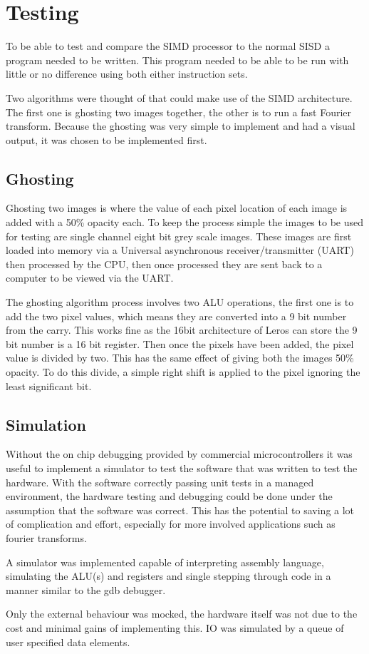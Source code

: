 \section{Testing}

To be able to test and compare the SIMD processor to the normal SISD a program
needed to be written. This program needed to be able to be run with little or no
difference using both either instruction sets.

Two algorithms were thought of that could make use of the SIMD architecture.
The first one is ghosting two images together, the other is to run a fast
Fourier transform. Because the ghosting was very simple to implement and had a
visual output, it was chosen to be implemented first.

\subsection{Ghosting}
  Ghosting two images is where the value of each pixel location of each image is
  added with a 50\% opacity each. To keep the process simple the images to be
  used for testing are single channel eight bit grey scale images. These images
  are first loaded into memory via a Universal asynchronous receiver/transmitter
  (UART) then processed by the CPU, then once processed they are sent back to a
  computer to be viewed via the UART.


  The ghosting algorithm process involves two ALU operations, the first one is
  to add the two pixel values, which means they are converted into a 9 bit
  number from the carry. This works fine as the 16bit architecture of Leros can
  store the 9 bit number is a 16 bit register. Then once the pixels have been
  added, the pixel value is divided by two. This has the same effect of giving
  both the images 50\% opacity. To do this divide, a simple right shift is
  applied to the pixel ignoring the least significant bit.

\subsection{Simulation}
 Without the on chip debugging provided by commercial microcontrollers it was
 useful to implement a simulator to test the software that was written to test
 the hardware. With the software correctly passing unit tests in a managed
 environment, the hardware testing and debugging could be done under the
 assumption that the software was correct. This has the potential to saving a lot
 of complication and effort, especially for more involved applications such as
 fourier transforms.

 A simulator was implemented capable of interpreting assembly language,
 simulating the ALU(s) and registers and single stepping through code in a
 manner similar to the gdb debugger.

 Only the external behaviour was mocked, the hardware itself was not due to the
 cost and minimal gains of implementing this. IO was simulated by a queue of
 user specified data elements.
